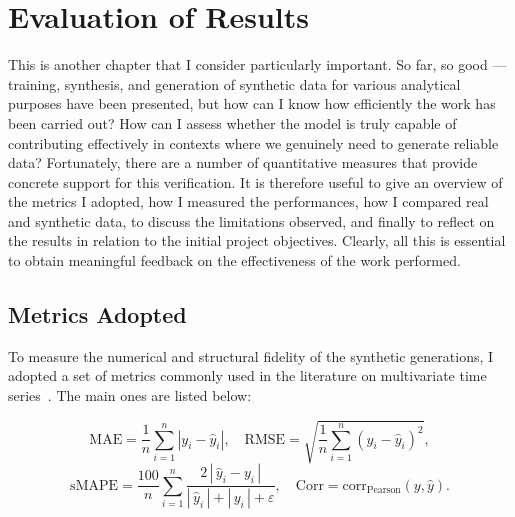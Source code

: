 \chapter{Evaluation of Results}

This is another chapter that I consider particularly important. So far, so good — training, synthesis, and generation of synthetic data for various analytical purposes have been presented, but how can I know how efficiently the work has been carried out?  
How can I assess whether the model is truly capable of contributing effectively in contexts where we genuinely need to generate reliable data?  
Fortunately, there are a number of quantitative measures that provide concrete support for this verification.  
It is therefore useful to give an overview of the metrics I adopted, how I measured the performances, how I compared real and synthetic data, to discuss the limitations observed, and finally to reflect on the results in relation to the initial project objectives.  
Clearly, all this is essential to obtain meaningful feedback on the effectiveness of the work performed.

\section{Metrics Adopted}

To measure the numerical and structural fidelity of the synthetic generations, I adopted a set of metrics commonly used in the literature on multivariate time series~\cite{hyndman2006another,willmott2005advantages,han2011data}.  
The main ones are listed below:

\[
\mathrm{MAE} = \frac{1}{n}\sum_{i=1}^{n} |y_i - \widehat{y}_i|, 
\quad
\mathrm{RMSE} = \sqrt{\frac{1}{n}\sum_{i=1}^{n}(y_i - \widehat{y}_i)^2},
\]
\[
\mathrm{sMAPE} = \frac{100}{n}\sum_{i=1}^{n}
\frac{2\,|\,\widehat{y}_i - y_i\,|}{|\,\widehat{y}_i\,| + |\,y_i\,| + \varepsilon},
\quad
\mathrm{Corr} = \mathrm{corr}_{\text{Pearson}}(y, \widehat{y}).
\]

